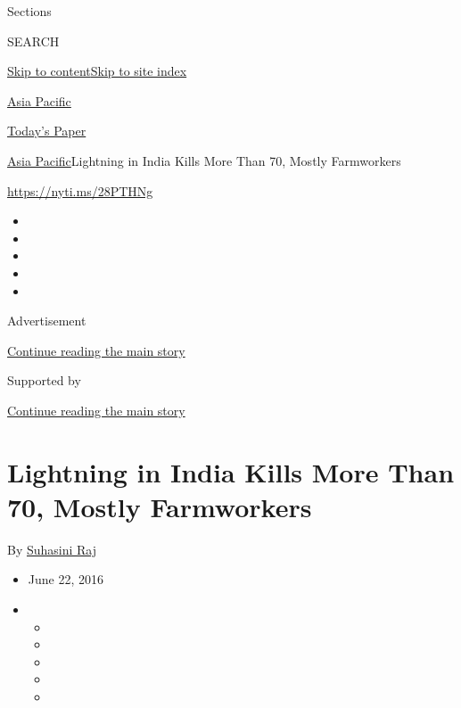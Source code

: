 Sections

SEARCH

\protect\hyperlink{site-content}{Skip to
content}\protect\hyperlink{site-index}{Skip to site index}

\href{https://www.nytimes.com/section/world/asia}{Asia Pacific}

\href{https://myaccount.nytimes.com/auth/login?response_type=cookie\&client_id=vi}{}

\href{https://www.nytimes.com/section/todayspaper}{Today's Paper}

\href{/section/world/asia}{Asia Pacific}\textbar{}Lightning in India
Kills More Than 70, Mostly Farmworkers

\url{https://nyti.ms/28PTHNg}

\begin{itemize}
\item
\item
\item
\item
\item
\end{itemize}

Advertisement

\protect\hyperlink{after-top}{Continue reading the main story}

Supported by

\protect\hyperlink{after-sponsor}{Continue reading the main story}

\hypertarget{lightning-in-india-kills-more-than-70-mostly-farmworkers}{%
\section{Lightning in India Kills More Than 70, Mostly
Farmworkers}\label{lightning-in-india-kills-more-than-70-mostly-farmworkers}}

By \href{https://www.nytimes.com/by/suhasini-raj}{Suhasini Raj}

\begin{itemize}
\item
  June 22, 2016
\item
  \begin{itemize}
  \item
  \item
  \item
  \item
  \item
  \end{itemize}
\end{itemize}

